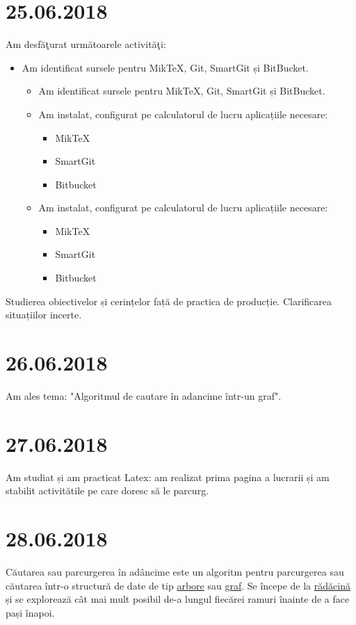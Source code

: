 \documentclass{report}
\begin{document}
\chapter{25.06.2018}
Am desfăţurat următoarele activităţi:
\begin{itemize}
\item
Am identificat sursele pentru MikTeX, Git, SmartGit și BitBucket.
\begin{itemize}
\item
Am identificat sursele pentru MikTeX, Git, SmartGit și BitBucket.
\item
Am instalat, configurat pe calculatorul de lucru aplicațiile necesare:
\begin{itemize}
\item
MikTeX
\item
SmartGit
\item
Bitbucket
\end{itemize}
\item
Am instalat, configurat pe calculatorul de lucru aplicațiile necesare:
\begin{itemize}
\item
MikTeX
\item
SmartGit
\item
Bitbucket
\end{itemize}
\end{itemize}
\end{itemize}
Studierea obiectivelor și cerințelor față de practica de producție. Clarificarea situațiilor incerte.


\chapter{26.06.2018}
Am ales tema: "Algoritmul de cautare în adancime într-un graf".
\chapter{27.06.2018}
Am studiat și am practicat Latex: am realizat prima pagina a lucrarii și am stabilit activitătile pe care doresc să le parcurg.

\chapter{28.06.2018}

Căutarea sau parcurgerea în adâncime este un algoritm pentru parcurgerea sau căutarea într-o structură de date de tip \underline{arbore} sau \underline{graf}. Se începe de la \underline{rădăcină} și se explorează cât mai mult posibil de-a lungul fiecărei ramuri înainte de a face pași înapoi.
\end{document}
